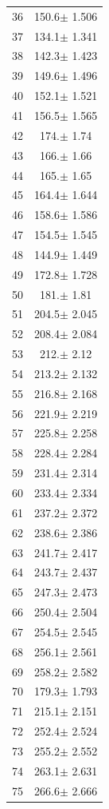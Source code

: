\documentclass[a4paper]{instrumentacao}
\begin{document}
\begin{longtable}{cc}
 36 & 150.6$\pm$ 1.506 \\
 37 & 134.1$\pm$ 1.341 \\
 38 & 142.3$\pm$ 1.423 \\
 39 & 149.6$\pm$ 1.496 \\
 40 & 152.1$\pm$ 1.521 \\
 41 & 156.5$\pm$ 1.565 \\
 42 & 174.$\pm$ 1.74 \\
 43 & 166.$\pm$ 1.66 \\
 44 & 165.$\pm$ 1.65 \\
 45 & 164.4$\pm$ 1.644 \\
 46 & 158.6$\pm$ 1.586 \\
 47 & 154.5$\pm$ 1.545 \\
 48 & 144.9$\pm$ 1.449 \\
 49 & 172.8$\pm$ 1.728 \\
 50 & 181.$\pm$ 1.81 \\
 51 & 204.5$\pm$ 2.045 \\
 52 & 208.4$\pm$ 2.084 \\
 53 & 212.$\pm$ 2.12 \\
 54 & 213.2$\pm$ 2.132 \\
 55 & 216.8$\pm$ 2.168 \\
 56 & 221.9$\pm$ 2.219 \\
 57 & 225.8$\pm$ 2.258 \\
 58 & 228.4$\pm$ 2.284 \\
 59 & 231.4$\pm$ 2.314 \\
 60 & 233.4$\pm$ 2.334 \\
 61 & 237.2$\pm$ 2.372 \\
 62 & 238.6$\pm$ 2.386 \\
 63 & 241.7$\pm$ 2.417 \\
 64 & 243.7$\pm$ 2.437 \\
 65 & 247.3$\pm$ 2.473 \\
 66 & 250.4$\pm$ 2.504 \\
 67 & 254.5$\pm$ 2.545 \\
 68 & 256.1$\pm$ 2.561 \\
 69 & 258.2$\pm$ 2.582 \\
 70 & 179.3$\pm$ 1.793 \\
 71 & 215.1$\pm$ 2.151 \\
 72 & 252.4$\pm$ 2.524 \\
 73 & 255.2$\pm$ 2.552 \\
 74 & 263.1$\pm$ 2.631 \\
 75 & 266.6$\pm$ 2.666 \\

\end{longtable}
\end{document}
